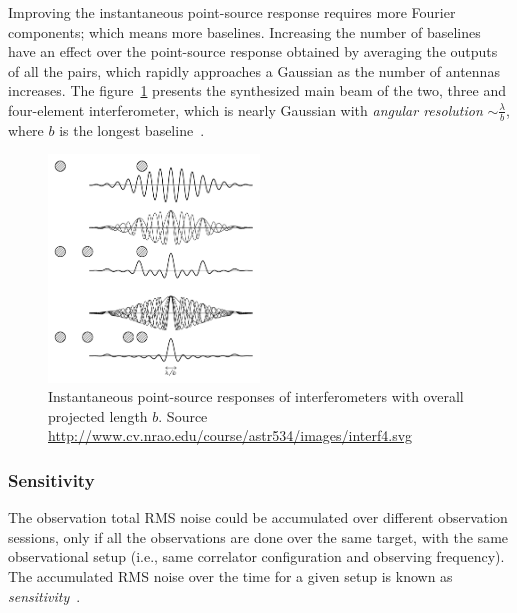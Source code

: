 Improving the instantaneous point-source response requires more Fourier components; which means more baselines. Increasing the number of baselines have an effect over the point-source response obtained by averaging the outputs of all the pairs, which rapidly approaches a Gaussian as the number of antennas increases. The figure~\ref{fig:interf-components} presents the synthesized main beam of the two, three and four-element interferometer, which is nearly Gaussian with \textit{angular resolution} $\sim \frac{\lambda}{b}$, where $b$ is the longest baseline~\cite{condon10}.  
\begin{figure}[htbp]
\centering
\includegraphics[width=0.5\textwidth]{images/interf4}
\caption[Instantaneous point-source responses of interferometers with overall projected length $b$]{Instantaneous point-source responses of interferometers with overall projected length $b$. Source \url{http://www.cv.nrao.edu/course/astr534/images/interf4.svg}}
\label{fig:interf-components}
\end{figure}

\subsubsection{Sensitivity}
\label{sec:sens}
The observation total RMS noise could be accumulated over different observation sessions, only if all the observations are done over the same target, with the same observational setup (i.e., same correlator configuration and observing frequency). The accumulated RMS noise over the time for a given setup is known as \textit{sensitivity}~\cite{avarias11}.


